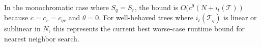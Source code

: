 


%


In the monochromatic case where $S_q = S_r$, the bound is $O(c^9 (N +
i_t(\mathscr{T}))$ because $c = c_r = c_{qr}$ and $\theta = 0$.  For
well-behaved trees where $i_t(\mathscr{T}_q)$ is linear or sublinear in $N$,
this represents the current best worse-case runtime bound for nearest neighbor
search.
